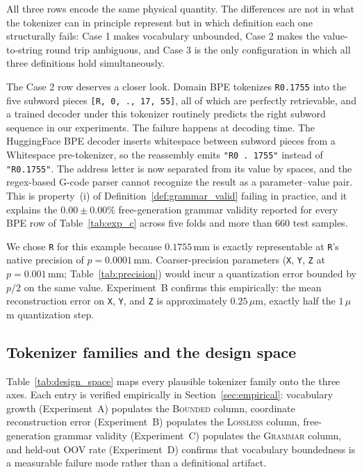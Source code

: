 \documentclass[11pt]{article}
\begin{document}
All three rows encode the same physical quantity. The differences are not in what the tokenizer can in principle represent but in which definition each one structurally fails: Case 1 makes vocabulary unbounded, Case 2 makes the value-to-string round trip ambiguous, and Case 3 is the only configuration in which all three definitions hold simultaneously.

The Case 2 row deserves a closer look. Domain BPE tokenizes \texttt{R0.1755} into the five subword pieces \texttt{[R, 0, ., 17, 55]}, all of which are perfectly retrievable, and a trained decoder under this tokenizer routinely predicts the right subword sequence in our experiments. The failure happens at decoding time. The HuggingFace BPE decoder inserts whitespace between subword pieces from a Whitespace pre-tokenizer, so the reassembly emits \texttt{"R0 . 1755"} instead of \texttt{"R0.1755"}. The address letter is now separated from its value by spaces, and the regex-based G-code parser cannot recognize the result as a parameter--value pair. This is property~(i) of Definition~\ref{def:grammar_valid} failing in practice, and it explains the $0.00 \pm 0.00\%$ free-generation grammar validity reported for every BPE row of Table~\ref{tab:exp_c} across five folds and more than 660 test samples.

We chose \texttt{R} for this example because $0.1755\,$mm is exactly representable at \texttt{R}'s native precision of $p = 0.0001\,$mm. Coarser-precision parameters (\texttt{X}, \texttt{Y}, \texttt{Z} at $p = 0.001\,$mm; Table~\ref{tab:precision}) would incur a quantization error bounded by $p/2$ on the same value. Experiment~B confirms this empirically: the mean reconstruction error on \texttt{X}, \texttt{Y}, and \texttt{Z} is approximately $0.25\,\mu$m, exactly half the $1\,\mu$m quantization step.

\subsection{Tokenizer families and the design space}
\label{sec:tokenizer_families}

Table~\ref{tab:design_space} maps every plausible tokenizer family onto the three axes. Each entry is verified empirically in Section~\ref{sec:empirical}: vocabulary growth (Experiment~A) populates the \textsc{Bounded} column, coordinate reconstruction error (Experiment~B) populates the \textsc{Lossless} column, free-generation grammar validity (Experiment~C) populates the \textsc{Grammar} column, and held-out OOV rate (Experiment~D) confirms that vocabulary boundedness is a measurable failure mode rather than a definitional artifact.
\end{document}
